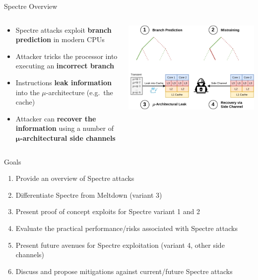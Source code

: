 \documentclass[10pt, dvipsnames, aspectratio=169]{beamer}
\begin{document}
\begingroup
\setwatermark{}
\begin{frame}[c]{Spectre Overview}

\begin{columns}
  \begin{column}{0.5\textwidth}
    \begin{itemize}
      \item Spectre attacks exploit {\bf branch prediction} in modern CPUs
      \vspace{2.2em}
      \item Attacker tricks the processor into executing an {\bf incorrect branch}
      \vspace{2.2em}
      \item Instructions {\bf leak information} into the $\mu$-architecture (e.g.~the cache)
      \vspace{2.2em}
      \item Attacker can {\bf recover the information} using a number of {\bf $\boldsymbol{\mu}$-architectural side channels}
    \end{itemize}
  \end{column}

  \begin{column}{0.5\textwidth}
    \color{black}
    \centering
    \includegraphics[width=0.8\linewidth]{figs/overview.pdf}
  \end{column}
\end{columns}
\end{frame}
\endgroup

\begin{frame}[c]{Goals}
  \begin{enumerate}
    \item Provide an overview of Spectre attacks
    \vfill
    \item Differentiate Spectre from Meltdown (variant 3)
    \vfill
    \item Present proof of concept exploits for Spectre variant 1 and 2
    \vfill
    \item Evaluate the practical performance/risks associated with Spectre attacks
    \vfill
    \item Present future avenues for Spectre exploitation (variant 4, other side channels)
    \vfill
    \item Discuss and propose mitigations against current/future Spectre attacks
  \end{enumerate}
\end{frame}
\end{document}
